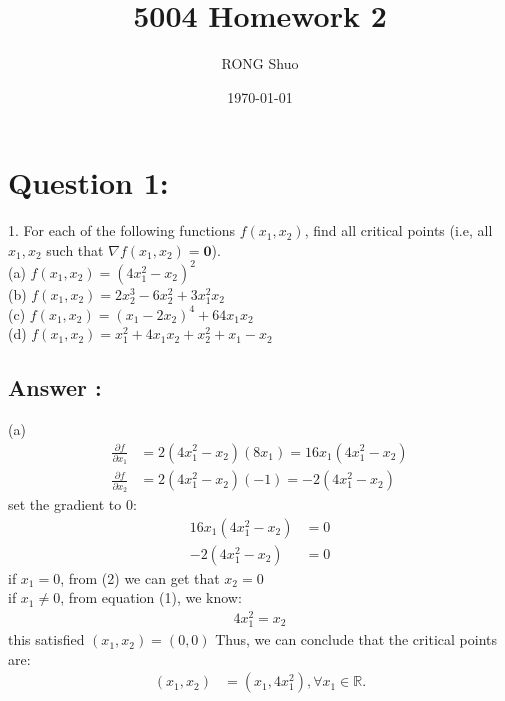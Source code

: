 \documentclass[a4paper,12pt]{article}
\newcommand{\R}{\mathbb{R}}
\begin{document}
\title{5004 Homework 2}
\author{RONG Shuo}
\date{\today}
\maketitle


\section*{Question 1:}
1. For each of the following functions \(f(x_1, x_2)\), find all critical points (i.e, all \(x_1, x_2\) such that \( \nabla f(x_1, x_2) = \bm{0}\)). \\

(a) \(f(x_1, x_2) = (4x_1^2 - x_2)^2\) \\
(b) \( f(x_1, x_2) = 2x_2^3 - 6x_2^2 + 3x_1^2x_2\) \\
(c) \(f(x_1, x_2) = (x_1 - 2x_2)^4 + 64x_1x_2\) \\
(d) \(f(x_1, x_2) = x_1^2 + 4x_1x_2 + x_2^2 + x_1 - x_2\) \\

\subsection*{Answer :}
(a)
\begin{align*}
    \frac{\partial f}{ \partial x_1} &= 2(4x_1^2 - x_2)(8x_1) = 16x_1(4x_1^2 - x_2) \\
    \frac{\partial f}{ \partial x_2} &= 2(4x_1^2 - x_2)(-1) = -2(4x_1^2 - x_2)
\end{align*}
set the gradient to 0:
\begin{align}
    16x_1(4x_1^2 - x_2) &= 0 \\
    -2(4x_1^2 - x_2) &= 0 
\end{align}
if \(x_1 = 0\), from (2) we can get that \(x_2 = 0\) \\
if \(x_1 \ne 0\), from equation (1), we know:
\begin{align*}
    4x_1^2 = x_2
\end{align*}
this satisfied \((x_1, x_2) = (0, 0)\)
Thus, we can conclude that the critical points are:
\begin{align*}
    (x_1, x_2) &= (x_1, 4x_1^2) ,\forall x_1 \in \R.
\end{align*}
\end{document}
